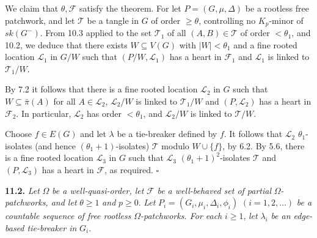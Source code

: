 We claim that $\theta, \mathcal{F}$ satisfy the theorem. For let $P = (G, \mu, \Delta)$ be a rootless free patchwork, and let $\mathcal{T}$ be a tangle in $G$ of order $\ge \theta$, controlling no $K_p$-minor of $sk(G^-)$. From 10.3 applied to the set $\mathcal{T}_1$ of all $(A, B) \in \mathcal{T}$ of order $< \theta_1$, and 10.2, we deduce that there exists $W \subseteq V(G)$ with $|W| < \theta_1$ and a fine rooted location $\mathcal{L}_1$ in $G/W$ such that $(P/W, \mathcal{L}_1)$ has a heart in $\mathcal{F}_1$ and $\mathcal{L}_1$ is linked to $\mathcal{T}_1/W$.

By 7.2 it follows that there is a fine rooted location $\mathcal{L}_2$ in $G$ such that $W \subseteq \bar{\pi}(A)$ for all $A \in \mathcal{L}_2$, $\mathcal{L}_2/W$ is linked to $\mathcal{T}_1/W$ and $(P, \mathcal{L}_2)$ has a heart in $\mathcal{F}_2$. In particular, $\mathcal{L}_2$ has order $< \theta_1$, and $\mathcal{L}_2/W$ is linked to $\mathcal{T}/W$.

Choose $f \in E(G)$ and let $\lambda$ be a tie-breaker defined by $f$. It follows that $\mathcal{L}_2$ $\theta_1$-isolates (and hence $(\theta_1 + 1)$-isolates) $\mathcal{T}$ modulo $W \cup \{f\}$, by 6.2. By 5.6, there is a fine rooted location $\mathcal{L}_3$ in $G$ such that $\mathcal{L}_3$ $(\theta_1 + 1)^2$-isolates $\mathcal{T}$ and $(P, \mathcal{L}_3)$ has a heart in $\mathcal{F}$, as required. $\square$

\textbf{11.2.} \textit{Let} $\Omega$ \textit{be a well-quasi-order, let} $\mathcal{F}$ \textit{be a well-behaved set of partial} $\Omega$\textit{-patchworks, and let} $\theta \ge 1$ \textit{and} $p \ge 0$. \textit{Let} $P_i = (G_i, \mu_i, \Delta_i, \phi_i)$ $(i = 1, 2, \dots)$ \textit{be a countable sequence of free rootless} $\Omega$\textit{-patchworks. For each} $i \ge 1$, \textit{let} $\lambda_i$ \textit{be an edge-based tie-breaker in} $G_i$.
